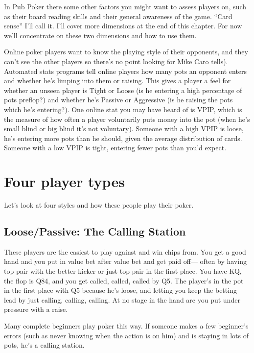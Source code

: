 In Pub Poker there some other factors you might want to assess
players on, such as their board reading skills and their general
awareness of the game. ``Card sense'' I'll call it.  I'll cover more
dimensions at the end of this chapter. For now we'll concentrate on these
two dimensions and how to use them.

Online poker players want to know the playing style of their
opponents, and they can't see the other players so there's no point
looking for Mike Caro tells). Automated stats programs tell online
players how many pots an opponent enters and whether he's limping into
them or raising. This gives a player a feel for whether an unseen
player is Tight or Loose (is he entering a high percentage of pots
preflop?) and whether he's Passive or Aggressive (is he raising the
pots which he's entering?). One online stat you may have heard of is
VPIP, which is the measure of how often a player voluntarily puts
money into the pot (when he's small blind or big blind it's not
voluntary). Someone with a high VPIP is loose, he's entering more pots
than he should, given the average distribution of cards. Someone with
a low VPIP is tight, entering fewer pots than you'd expect.

\section{Four player types}

Let's look at four styles and how these people play their poker.

\subsection{Loose/Passive: The Calling Station}

These players are the easiest to play against and win chips from.
You get a good hand and you put in value bet after value bet and
get paid off--- often by having top pair with the better kicker or
just top pair in the first place. You have KQ, the flop is Q84, and
you get called, called, called by Q5. The player's in the pot in the
first place with Q5 because he's loose, and letting you keep the
betting lead by just calling, calling, calling. At no stage in
the hand are you put under pressure with a raise.

Many complete beginners play poker this way. If someone makes
a few beginner's errors (such as never knowing when the action
is on him) and is staying in lots of pots, he's a calling station.


